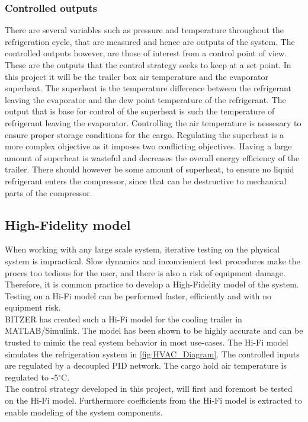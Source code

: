 \subsubsection{Controlled outputs}
There are several variables such as pressure and temperature throughout the refrigeration cycle, that are measured and hence are outputs of the system. The controlled outputs however, are those of interest from a control point of view. These are the outputs that the control strategy seeks to keep at a set point. In this project it will be the trailer box air temperature and the evaporator superheat. The superheat is the temperature difference between the refrigerant leaving the evaporator and the dew point temperature of the refrigerant. The output that is base for control of the superheat is such the temperature of refrigerant leaving the evaporator.
Controlling the air temperature is nessesary to ensure proper storage conditions for the cargo. Regulating the superheat is a more complex objective as it imposes two conflicting objectives. Having a large amount of superheat is wasteful and decreases the overall energy efficiency of the trailer. There should however be some amount of superheat, to ensure no liquid refrigerant enters the compressor, since that can be destructive to mechanical parts of the compressor.

\subsection{High-Fidelity model}
When working with any large scale system, iterative testing on the physical system is impractical. Slow dynamics and inconvienient test procedures make the proces too tedious for the user, and there is also a risk of equipment damage. Therefore, it is common practice to develop a High-Fidelity model of the system. Testing on a Hi-Fi model can be performed faster, efficiently and with no equipment risk. \\

BITZER has created such a Hi-Fi model for the cooling trailer in MATLAB/Simulink. The model has been shown to be highly accurate and can be trusted to mimic the real system behavior in most use-cases. The Hi-Fi model simulates the refrigeration system in \cref{fig:HVAC_Diagram}. The controlled inputs are regulated by a decoupled PID network. The cargo hold air temperature is regulated to -5$^{\circ}$C.\\

The control strategy developed in this project, will first and foremost be tested on the Hi-Fi model. Furthermore coefficients from the Hi-Fi model is extracted to enable modeling of the system components.


